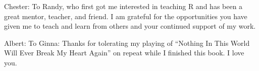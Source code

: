 \cleardoublepage\newpage
\thispagestyle{empty}

\vspace*{2in}

\begin{center}
Chester: To Randy, who first got me interested in teaching R and has been a great mentor, teacher, and friend. I am grateful for the opportunities you have given me to teach and learn from others and your continued support of my work.

\vspace{0.3in}

Albert:  To Ginna: Thanks for tolerating my playing of ``Nothing In This World Will Ever Break My Heart Again'' on repeat while I finished this book. I love you.
\end{center}

\setlength{\abovedisplayskip}{-5pt}
\setlength{\abovedisplayshortskip}{-5pt}
